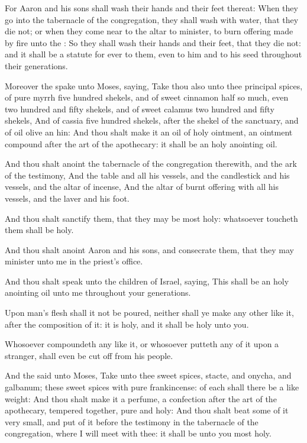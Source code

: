 \verse For Aaron and his sons shall wash their hands and their feet thereat: \verse When they go into the tabernacle of the congregation, they shall wash with water, that they die not; or when they come near to the altar to minister, to burn offering made by fire unto the \LORD: \verse So they shall wash their hands and their feet, that they die not: and it shall be a statute for ever to them, even to him and to his seed throughout their generations.

\verse Moreover the \LORD spake unto Moses, saying, \verse Take thou also unto thee principal spices, of pure myrrh five hundred shekels, and of sweet cinnamon half so much, even two hundred and fifty shekels, and of sweet calamus two hundred and fifty shekels, \verse And of cassia five hundred shekels, after the shekel of the sanctuary, and of oil olive an hin: \verse And thou shalt make it an oil of holy ointment, an ointment compound after the art of the apothecary: it shall be an holy anointing oil.

\verse And thou shalt anoint the tabernacle of the congregation therewith, and the ark of the testimony, \verse And the table and all his vessels, and the candlestick and his vessels, and the altar of incense, \verse And the altar of burnt offering with all his vessels, and the laver and his foot.

\verse And thou shalt sanctify them, that they may be most holy: whatsoever toucheth them shall be holy.

\verse And thou shalt anoint Aaron and his sons, and consecrate them, that they may minister unto me in the priest's office.

\verse And thou shalt speak unto the children of Israel, saying, This shall be an holy anointing oil unto me throughout your generations.

\verse Upon man's flesh shall it not be poured, neither shall ye make any other like it, after the composition of it: it is holy, and it shall be holy unto you.

\verse Whosoever compoundeth any like it, or whosoever putteth any of it upon a stranger, shall even be cut off from his people.

\verse And the \LORD said unto Moses, Take unto thee sweet spices, stacte, and onycha, and galbanum; these sweet spices with pure frankincense: of each shall there be a like weight: \verse And thou shalt make it a perfume, a confection after the art of the apothecary, tempered together, pure and holy: \verse And thou shalt beat some of it very small, and put of it before the testimony in the tabernacle of the congregation, where I will meet with thee: it shall be unto you most holy.

